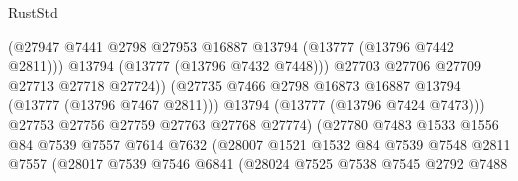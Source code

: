 \begin{lexlean}{RustStd}
\begin{coremodule}
                                          (@27947
                                            @7441
                                            @2798
                                            @27953
                                            @16887
                                            @13794
                                            (@13777 (@13796 @7442 @2811)))
                                          @13794
                                          (@13777 (@13796 @7432 @7448)))
                                        @27703
                                        @27706
                                        @27709
                                        @27713
                                        @27718
                                        @27724))
                                    (@27735
                                      @7466
                                      @2798
                                      @16873
                                      @16887
                                      @13794
                                      (@13777 (@13796 @7467 @2811)))
                                    @13794
                                    (@13777 (@13796 @7424 @7473)))
                                  @27753
                                  @27756
                                  @27759
                                  @27763
                                  @27768
                                  @27774)
                                (@27780
                                  @7483
                                  @1533
                                  @1556
                                  @84
                                  @7539
                                  @7557
                                  @7614
                                  @7632
                                  (@28007
                                    @1521
                                    @1532
                                    @84
                                    @7539
                                    @7548
                                    @2811
                                    @7557
                                    (@28017
                                      @7539
                                      @7546
                                      @6841
                                      (@28024
                                        @7525
                                        @7538
                                        @7545
                                        @2792
                                        @7488

\end{coremodule}
\end{lexlean}
